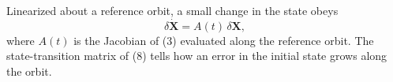 Linearized about a reference orbit, a small change in the state obeys
\begin{equation}
  \delta\dot{\mathbf X} = A(t)\,\delta\mathbf X,
\end{equation}
where $A(t)$ is the Jacobian of (3) evaluated along the reference orbit.
The state-transition matrix of (8) tells how an error in the initial state
grows along the orbit.
